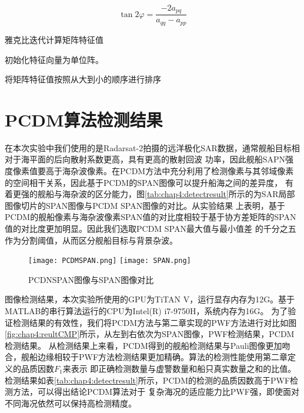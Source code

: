        \begin{equation}
           \label{equ:chap4:rotationangle}
           \tan 2\varphi  = \frac{{ - 2{a_{pq}}}}{{{a_{qq}} - {a_{pp}}}}
       \end{equation}

    \begin{algorithm}[htb]
      \caption{雅克比迭代计算矩阵特征值}
      \label{alg:chap4:jacobianeigen}
      \BlankLine
      初始化特征向量为单位阵。


      将矩阵特征值按照从大到小的顺序进行排序
    \end{algorithm}

\section{PCDM算法检测结果}
    在本次实验中我们使用的是Radarsat-2拍摄的远洋极化SAR数据，通常舰船目标相对于海平面的后向散射系数更高，具有更高的散射回波
    功率，因此舰船SAPN强度像素值要高于海杂波像素。在PCDM方法中充分利用了检测像素与其邻域像素的空间相干关系，因此基于PCDM的SPAN图像可以提升船海之间的差异度，
    有着更强的舰船与海杂波的区分能力，图\ref{tab:chap4:detectresult}所示的为SAR局部图像切片的SPAN图像与PCDM SPAN图像的对比。从实验结果
    上表明，基于PCDM的舰船像素与海杂波像素SPAN值的对比度相较于基于协方差矩阵的SPAN值的对比度更加明显。因此我们选取PCDM SPAN最大值与最小值差
    的千分之五作为分割阈值，从而区分舰船目标与背景杂波。

  \begin{figure}[h]
    \centering
        {\texttt{[image: PCDMSPAN.png]}}
        {\texttt{[image: SPAN.png]}}
    \caption{PCDNSPAN图像与SPAN图像对比}
    \label{fig:chap4:SPANCMP}
  \end{figure}

  图像检测结果，本次实验所使用的GPU为TiTAN V，运行显存内存为12G。基于MATLAB的串行算法运行的CPU为Intel(R) i7-9750H，系统内存为16G。
  为了验证检测结果的有效性，我们将PCDM方法与第二章实现的PWF方法进行对比如图\ref{fig:chap4:reultCMP}所示，从左到右依次为SPAN图像，PWF检测结果，PCDM检测结果。
  从检测结果上来看，PCDM得到的舰船检测结果与Pauli图像更加吻合，舰船边缘相较于PWF方法检测结果更加精确。算法的检测性能使用第二章定义的品质因数$F_1$来表示
  即正确检测数量与虚警数量和船只真实数量之和的比值。检测结果如表\ref{tab:chap4:detectresult}所示，PCDM的检测的品质因数高于PWF检测方法，可以得出结论PCDM算法对于
  复杂海况的适应能力比PWF强，即使面对不同海况依然可以保持高检测精度。

